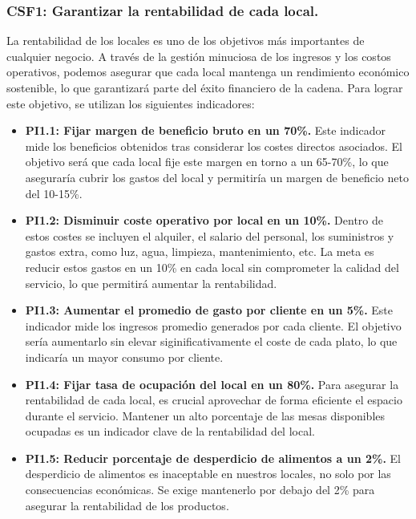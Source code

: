 \documentclass[12pt]{opticajnl}
\begin{document}
\subsubsection*{CSF1: Garantizar la rentabilidad de cada local.}

La rentabilidad de los locales es uno de los objetivos más importantes de cualquier negocio. A través de la gestión minuciosa de los ingresos y los costos operativos, podemos asegurar que cada local mantenga un rendimiento económico sostenible, lo que garantizará parte del éxito financiero de la cadena. Para lograr este objetivo, se utilizan los siguientes indicadores:

\begin{itemize}
    \item \textbf{PI1.1: Fijar margen de beneficio bruto en un 70\%.} Este indicador mide los beneficios obtenidos tras considerar los costes directos asociados. El objetivo será que cada local fije este margen en torno a un 65-70\%, lo que aseguraría cubrir los gastos del local y permitiría un margen de beneficio neto del 10-15\%. 
    \item \textbf{PI1.2: Disminuir coste operativo por local en un 10\%.} Dentro de estos costes se incluyen el alquiler, el salario del personal, los suministros y gastos extra, como luz, agua, limpieza, mantenimiento, etc. La meta es reducir estos gastos en un 10\% en cada local sin comprometer la calidad del servicio, lo que permitirá aumentar la rentabilidad.
    \item \textbf{PI1.3: Aumentar el promedio de gasto por cliente en un 5\%.} Este indicador mide los ingresos promedio generados por cada cliente. El objetivo sería aumentarlo sin elevar siginificativamente el coste de cada plato, lo que indicaría un mayor consumo por cliente. 
    \item \textbf{PI1.4: Fijar tasa de ocupación del local en un 80\%.} Para asegurar la rentabilidad de cada local, es crucial aprovechar de forma eficiente el espacio durante el servicio. Mantener un alto porcentaje de las mesas disponibles ocupadas es un indicador clave de la rentabilidad del local.
    \item \textbf{PI1.5: Reducir porcentaje de desperdicio de alimentos a un 2\%.} El desperdicio de alimentos es inaceptable en nuestros locales, no solo por las consecuencias económicas. Se exige mantenerlo por debajo del 2\% para asegurar la rentabilidad de los productos. 
\end{itemize}
\end{document}
